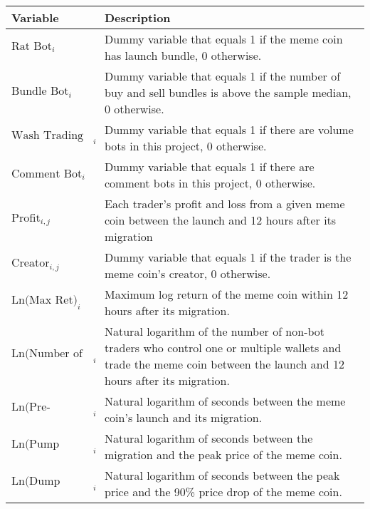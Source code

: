 \begin{tabularx}{\textwidth}{lX}\hline
Variable & Description \\
\hline
$\text{Rat Bot}_{i}$ & Dummy variable that equals 1 if the meme coin has launch bundle, 0 otherwise. \\
$\text{Bundle Bot}_{i}$ & Dummy variable that equals 1 if the number of buy and sell bundles is above the sample median, 0 otherwise. \\
$\text{Wash Trading Bot}_{i}$ & Dummy variable that equals 1 if there are volume bots in this project, 0 otherwise. \\
$\text{Comment Bot}_{i}$ & Dummy variable that equals 1 if there are comment bots in this project, 0 otherwise. \\
$\text{Profit}_{i,j}$ & Each trader's profit and loss from a given meme coin between the launch and 12 hours after its migration \\
$\text{Creator}_{i,j}$ & Dummy variable that equals 1 if the trader is the meme coin's creator, 0 otherwise. \\
$\text{Ln(Max Ret)}_{i}$ & Maximum log return of the meme coin within 12 hours after its migration. \\
$\text{Ln(Number of Traders)}_{i}$ & Natural logarithm of the number of non-bot traders who control one or multiple wallets and trade the meme coin between the launch and 12 hours after its migration. \\
$\text{Ln(Pre-Migration Duration)}_{i}$ & Natural logarithm of seconds between the meme coin's launch and its migration. \\
$\text{Ln(Pump Duration)}_{i}$ & Natural logarithm of seconds between the migration and the peak price of the meme coin. \\
$\text{Ln(Dump Duration)}_{i}$ & Natural logarithm of seconds between the peak price and the 90\% price drop of the meme coin. \\
\hline
\end{tabularx}
